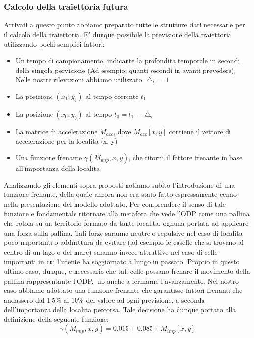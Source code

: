\subsubsection{Calcolo della traiettoria futura}
Arrivati a questo punto abbiamo preparato tutte le strutture dati necessarie
per il calcolo della traiettoria. E' dunque possibile la previsione della traiettoria
utilizzando pochi semplici fattori:
\begin{itemize}
\item Un tempo di campionamento, indicante la profondita temporale in secondi
della singola pervisione (Ad esempio: quanti secondi in avanti
prevedere). Nelle nostre rilevazioni abbiamo utilizzato $\bigtriangleup_{t} = 1$
\item La posizione $(x_{1}; y_{1})$ al tempo corrente $t_{1}$
\item La posizione $(x_{0}; y_{0})$ al tempo $t_{0} = t_{1} - \bigtriangleup_{t}$
\item La matrice di accelerazione $M_{acc}$, dove $M_{acc}[x,y]$ contiene il vettore di
accelerazione per la localita (x, y)
\item Una funzione frenante $\gamma(M_{imp},x,y)$, che ritorni il fattore frenante in base
all'importanza della localita
\end{itemize}
Analizzando gli elementi sopra proposti notiamo subito l'introduzione di
una funzione frenante, della quale ancora non era stato fatto espressamente
cenno nella presentazione del modello adottato. Per comprendere il senso di
tale funzione e fondamentale ritornare alla metafora che vede l'ODP come una
pallina che rotola su un territorio formato da tante localita, ognuna portata
ad applicare una forza sulla pallina. Tali forze saranno neutre o repulsive
nel caso di localita poco importanti o addirittura da evitare (ad esempio le
caselle che si trovano al centro di un lago o del mare) saranno invece attrattive
nel caso di celle importanti in cui l'utente ha soggiornato a lungo in passato.
Proprio in questo ultimo caso, dunque, e necessario che tali celle possano
frenare il movimento della pallina rappresentante l'ODP, no anche a fermarne
l'avanzamento.
Nel nostro caso abbiamo adottato una funzione frenante che garantisse
fattori frenanti che andassero dal 1.5\% al 10\% del valore ad ogni previsione,
a seconda dell'importanza della localita percorsa. Tale decisione ha dunque
portato alla definizione della seguente funzione:
\begin{equation}
    \gamma(M_{imp},x,y) = 0.015 + 0.085 \times M_{imp}[x,y]
\end{equation}
